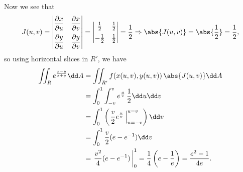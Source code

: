 \begin{example}
 Now we see that
 \[
 J(u,v) =
   \begin{vmatrix}
    \dfrac{\partial x}{\partial u} & \dfrac{\partial x}{\partial v}\vspace{2mm}\\
    \dfrac{\partial y}{\partial u} & \dfrac{\partial y}{\partial v}
   \end{vmatrix}
   =\begin{vmatrix}
    \frac12 & \frac12\vspace{2mm}\\
    -\frac12 & \frac12
   \end{vmatrix}
   = \frac12 \Rightarrow \abs{J(u,v)} = \abs{\frac12} = \frac12 ,
 \]
 so using horizontal slices in $R'$, we have
 \begin{align*}
  \iint_{R} e^{\frac{x-y}{x+y}} \dd A &= \iint_{R'} f(x(u,v),y(u,v))\,\abs{J(u,v)}\dd A\\
  &= \int_0^1 \int_{-v}^v e^{\frac uv} \, \frac12\dd u\dd v\\
  &= \int_0^1 \left(\left. \frac v2 e^{\frac uv} \,\right|_{u=-v}^{u=v} \right) \dd v\\
  &= \int_0^1 \frac v2 (e - e^{-1})\dd v\\
  &= \left.\frac{v^2}4 (e - e^{-1}) \,\right|_{0}^{1}
  = \frac14 \left( e - \frac1e \right) = \frac{e^2 - 1}{4e}.
 \end{align*}
\end{example}

